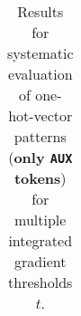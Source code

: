 \begin{table}[t]
\begin{tabular}{lllllll}

\\ \hline
\end{tabular}
\caption[Model Evaluation for only \texttt{AUX} tokens]{Results for systematic evaluation of one-hot-vector patterns (\textbf{only \texttt{AUX} tokens}) for multiple integrated gradient thresholds $t$.}
\label{tab:evalResultsAUX}
\end{table}
	